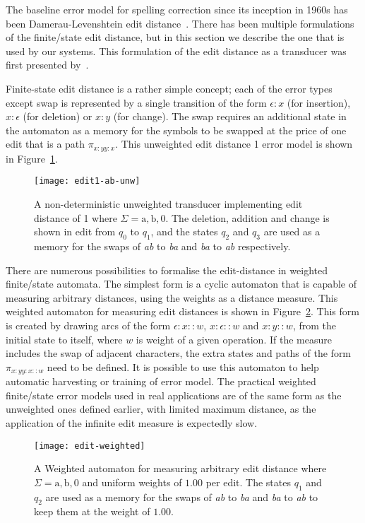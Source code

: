 \documentclass[officiallayout,final]{unihelcompling}
\begin{document}
The baseline error model for spelling correction since its inception in 1960s
has been Damerau-Levenshtein edit
distance~\citep{damerau1964technique,levenshtein1966binary}. There has been
multiple formulations of the finite\-/state edit distance, but in this section
we describe the one that is used by our systems. This formulation of the edit
distance as a transducer was first presented
by~\citet{schulz2002fast}.

Finite-state edit distance is a rather simple concept; each of the error types
except swap is represented by a single transition of the form $\epsilon:x$ (for
insertion), $x:\epsilon$ (for deletion) or $x:y$ (for change). The swap
requires an additional state in the automaton as a memory for the symbols to be
swapped at the price of one edit that is a path $\pi_{x:y y:x}$. This
unweighted edit distance 1 error model is shown in Figure~\ref{fig:edit1-ab}.

\begin{figure}
    \texttt{[image: edit1-ab-unw]}
    \caption{A non-deterministic unweighted transducer implementing
        edit distance of 1 where $\Sigma = {\mathrm{a}, \mathrm{b}, 0}$.
        The deletion, addition and change is shown in
        edit from $q_0$ to $q_1$, and the states $q_2$ and $q_3$ are used as a
        memory for the swaps of \emph{ab} to \emph{ba} and \emph{ba} to
        \emph{ab} respectively.  \label{fig:edit1-ab}}
\end{figure}

There are numerous possibilities to formalise the edit-distance in weighted
finite\-/state automata. The simplest form is a cyclic automaton that is
capable of measuring arbitrary distances, using the weights as a distance
measure. This weighted automaton for measuring edit distances is shown in
Figure~\ref{fig:edit-weighted}. This form is created by drawing arcs of the
form $\epsilon:x::w$, $x:\epsilon::w$ and $x:y::w$, from the initial state to
itself, where $w$ is weight of a given operation. If the measure includes the
swap of adjacent characters, the extra states and paths of the form $\pi_{x:y
y:x::w}$ need to be defined. It is possible to use this automaton to help
automatic harvesting or training of error model. The practical weighted
finite\-/state error models used in real applications are of the same form as
the unweighted ones defined earlier, with limited maximum distance, as the
application of the infinite edit measure is expectedly slow.

\begin{figure}
    \texttt{[image: edit-weighted]}
    \caption{A Weighted automaton for measuring arbitrary edit distance where
        $\Sigma = {\mathrm{a}, \mathrm{b}, 0}$ and uniform weights of $1.00$ per
        edit. The states $q_1$ and $q_2$ are used as a memory for
        the swaps of \emph{ab} to \emph{ba} and \emph{ba} to \emph{ab} to
        keep them at the weight of $1.00$. \label{fig:edit-weighted}}
\end{figure}
\end{document}
